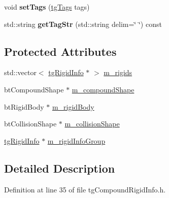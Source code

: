 \begin{DoxyCompactItemize}
\item 
\hypertarget{classtg_taggable_a5492888e4e4da4cca6261070b5726adf}{void {\bfseries set\-Tags} (\hyperlink{classtg_tags}{tg\-Tags} tags)}\label{classtg_taggable_a5492888e4e4da4cca6261070b5726adf}

\item 
\hypertarget{classtg_taggable_a346d66b066d2d9eb1eadba01da43749f}{std\-::string {\bfseries get\-Tag\-Str} (std\-::string delim=\char`\"{} \char`\"{}) const }\label{classtg_taggable_a346d66b066d2d9eb1eadba01da43749f}

\end{DoxyCompactItemize}
\subsection*{Protected Attributes}
\begin{DoxyCompactItemize}
\item 
std\-::vector$<$ \hyperlink{classtg_rigid_info}{tg\-Rigid\-Info} $\ast$ $>$ \hyperlink{classtg_compound_rigid_info_a4131882aec347aa599442b578ac6d4e9}{m\-\_\-rigids}
\item 
bt\-Compound\-Shape $\ast$ \hyperlink{classtg_compound_rigid_info_aa358527f84ddf5d2e42face8598ff439}{m\-\_\-compound\-Shape}
\item 
bt\-Rigid\-Body $\ast$ \hyperlink{classtg_compound_rigid_info_a1b1e22fe4f2693a8125c522fae7b68a2}{m\-\_\-rigid\-Body}
\item 
bt\-Collision\-Shape $\ast$ \hyperlink{classtg_rigid_info_a8a1c3ca00fe917c90d035e2ac101d4b1}{m\-\_\-collision\-Shape}
\item 
\hyperlink{classtg_rigid_info}{tg\-Rigid\-Info} $\ast$ \hyperlink{classtg_rigid_info_a410205a69125205c4d63883e1fcfb0ae}{m\-\_\-rigid\-Info\-Group}
\end{DoxyCompactItemize}


\subsection{Detailed Description}


Definition at line 35 of file tg\-Compound\-Rigid\-Info.\-h.



